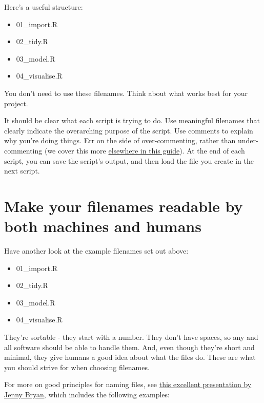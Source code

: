 \documentclass[]{book}
\providecommand{\tightlist}{%
  \setlength{\itemsep}{0pt}\setlength{\parskip}{0pt}}
\begin{document}
Here's a useful structure:

\begin{itemize}
\tightlist
\item
  01\_import.R
\item
  02\_tidy.R
\item
  03\_model.R
\item
  04\_visualise.R
\end{itemize}

You don't need to use these filenames. Think about what works best for your project.

It should be clear what each script is trying to do. Use meaningful filenames that clearly indicate the overarching purpose of the script. Use comments to explain why you're doing things. Err on the side of over-commenting, rather than under-commenting (we cover this more \protect\hyperlink{use-comments}{elsewhere in this guide}). At the end of each script, you can save the script's output, and then load the file you create in the next script.

\hypertarget{make-your-filenames-readable-by-both-machines-and-humans}{%
\section{Make your filenames readable by both machines and humans}\label{make-your-filenames-readable-by-both-machines-and-humans}}

Have another look at the example filenames set out above:

\begin{itemize}
\tightlist
\item
  01\_import.R
\item
  02\_tidy.R
\item
  03\_model.R
\item
  04\_visualise.R
\end{itemize}

They're sortable - they start with a number. They don't have spaces, so any and all software should be able to handle them. And, even though they're short and minimal, they give humans a good idea about what the files do. These are what you should strive for when choosing filenames.

For more on good principles for naming files, see \href{https://speakerdeck.com/jennybc/how-to-name-files}{this excellent presentation by Jenny Bryan}, which includes the following examples:
\end{document}

